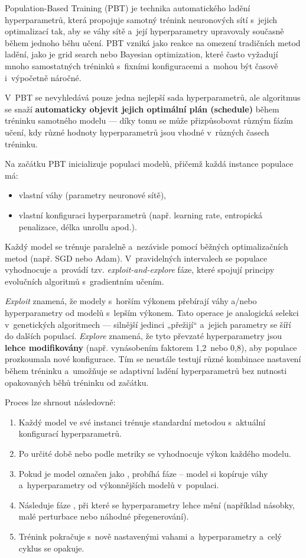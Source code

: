 Population-Based Training (PBT)\cite{Jaderberg2017} je technika automatického ladění hyperparametrů, která propojuje samotný trénink neuronových sítí s~jejich optimalizací tak, aby se váhy sítě a~její hyperparametry upravovaly současně během jednoho běhu učení. PBT vzniká jako reakce na omezení tradičních metod ladění, jako je grid search nebo Bayesian optimization, které často vyžadují mnoho samostatných tréninků s~fixními konfiguracemi a~mohou být časově i~výpočetně náročné.

V~PBT se nevyhledává pouze jedna nejlepší sada hyperparametrů, ale algoritmus se snaží \textbf{automaticky objevit jejich optimální plán (schedule)} během tréninku samotného modelu — díky tomu se může přizpůsobovat různým fázím učení, kdy různé hodnoty hyperparametrů jsou vhodné v~různých časech tréninku.

Na začátku PBT inicializuje populaci modelů, přičemž každá instance populace má:
\begin{itemize}
    \item vlastní váhy (parametry neuronové sítě),
    \item vlastní konfiguraci hyperparametrů (např. learning rate, entropická penalizace, délka unrollu apod.).
\end{itemize}

Každý model se trénuje paralelně a~nezávisle pomocí běžných optimalizačních metod (např. SGD nebo Adam). V~pravidelných intervalech se populace vyhodnocuje a~provádí tzv. \textit{exploit-and-explore} fáze, které spojují principy evolučních algoritmů s~gradientním učením.

\textit{Exploit} znamená, že modely s~horším výkonem přebírají váhy a/nebo hyperparametry od modelů s~lepším výkonem. Tato operace je analogická selekci v~genetických algoritmech — silnější jedinci „přežijí“ a~jejich parametry se šíří do dalších populací. 
\textit{Explore} znamená, že tyto převzaté hyperparametry jsou \textbf{lehce modifikovány} (např. vynásobením faktorem 1{,}2~nebo 0{,}8), aby populace prozkoumala nové konfigurace. Tím se neustále testují různé kombinace nastavení během tréninku a~umožňuje se adaptivní ladění hyperparametrů bez nutnosti opakovaných běhů tréninku od začátku.

Proces lze shrnout následovně:
\begin{enumerate}
    \item Každý model ve své instanci trénuje standardní metodou s~aktuální konfigurací hyperparametrů.
    \item Po určité době nebo podle metriky se vyhodnocuje výkon každého modelu.
    \item Pokud je model označen jako , probíhá fáze  – model si kopíruje váhy a~hyperparametry od výkonnějších modelů v~populaci.
    \item Následuje fáze , při které se hyperparametry lehce mění (například násobky, malé perturbace nebo náhodné přegenerování).
    \item Trénink pokračuje s~nově nastavenými vahami a~hyperparametry a~celý cyklus se opakuje.
\end{enumerate}

